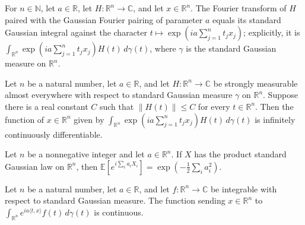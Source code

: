 \begin{lemma}
\label{BooleanAnalysis.GaussianSpace.gaussianFourierIntegral_eq}
\leanok
{}
For $n\in\mathbb N$, let $a\in\mathbb R$, let $H:\mathbb R^n\to\mathbb C$, and let
$x\in\mathbb R^n$. The Fourier transform of $H$ paired with the Gaussian Fourier pairing
of parameter $a$ equals its standard Gaussian integral against the character
$t\mapsto\exp\!\left(i a\sum_{j=1}^n t_jx_j\right)$; explicitly, it is $\int_{\mathbb
R^n}\exp\!\left(i a\sum_{j=1}^n t_jx_j\right)H(t)\,d\gamma(t)$, where $\gamma$ is the
standard Gaussian measure on $\mathbb R^n$.
\end{lemma}

\begin{lemma}
\label{BooleanAnalysis.GaussianSpace.contDiff_gaussianFourierIntegral}
\leanok
{}
Let $n$ be a natural number, let $a\in\mathbb R$, and let $H:\mathbb R^n\to\mathbb C$ be
strongly measurable almost everywhere with respect to standard Gaussian measure $\gamma$
on $\mathbb R^n$. Suppose there is a real constant $C$ such that $\|H(t)\|\le C$ for
every $t\in\mathbb R^n$. Then the function of $x\in\mathbb R^n$ given by $\int_{\mathbb
R^n}\exp\!\left(i a\sum_{j=1}^n t_jx_j\right)H(t)\,d\gamma(t)$ is infinitely
continuously differentiable.
\end{lemma}

\begin{lemma}
\label{BooleanAnalysis.GaussianSpace.integral_exp_mul_I_gaussianPi}
\leanok
{}
Let $n$ be a nonnegative integer and let $a\in\mathbb R^n$. If $X$ has the product
standard Gaussian law on $\mathbb R^n$, then $\mathbb E[e^{i\sum_i
a_iX_i}]=\exp\!\left(-\frac12\sum_i a_i^2\right)$.
\end{lemma}

\begin{lemma}
\label{BooleanAnalysis.GaussianSpace.continuous_gaussianFourierIntegral}
\leanok
{}
Let $n$ be a natural number, let $a\in\mathbb R$, and let $f:\mathbb R^n\to\mathbb C$ be
integrable with respect to standard Gaussian measure. The function sending $x\in\mathbb
R^n$ to $\int_{\mathbb R^n} e^{i a\langle t,x\rangle} f(t)\,d\gamma(t)$ is continuous.
\end{lemma}

